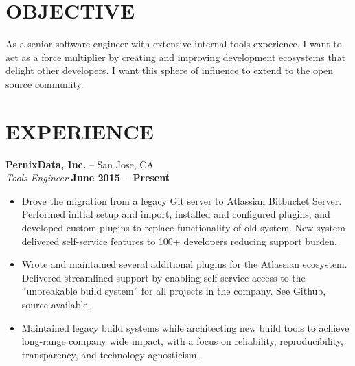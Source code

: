 \documentclass[line, margin]{res}
\begin{document}
\address{ Union City, CA \\ (206) 931-9916 \\ https://cmyers.org }

\begin{resume}

\section{OBJECTIVE}
As a senior software engineer with extensive internal tools experience, I want
to act as a force multiplier by creating and improving development ecosystems
that delight other developers.  I want this sphere of influence to extend to
the open source community.

\section{EXPERIENCE}
{\bf PernixData, Inc.} -- San Jose, CA
\\
\textit{Tools Engineer} \hfill {\bf June 2015 -- Present}
\\
\begin{itemize}
\item
Drove the migration from a legacy Git server to Atlassian Bitbucket Server.
Performed initial setup and import, installed and configured plugins, and
developed custom plugins to replace functionality of old system.  New system
delivered self-service features to 100+ developers reducing support burden.
\item
Wrote and maintained several additional plugins for the Atlassian ecosystem.
Delivered streamlined support by enabling self-service access to the
``unbreakable build system'' for all projects in the company.  See Github, source
available.
\item
Maintained legacy build systems while architecting new build tools to achieve
long-range company wide impact, with a focus on reliability, reproducibility,
transparency, and technology agnosticism.
\end{itemize}


\end{resume}
\end{document}
